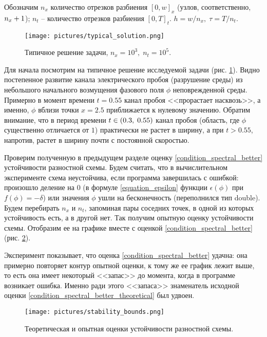 \documentclass[a4paper,12pt]{article}
\newcommand*{\hm}[1]{#1\nobreak\discretionary{}
{\hbox{$\mathsurround=0pt #1$}}{}}
\theoremstyle{plain}
\theoremstyle{definition}
\begin{document}
Обозначим $n_x$ количество отрезков разбиения $[0, w]_x$ (узлов, соответственно, $n_x \hm + 1$); $n_t$ -- количество отрезков разбиения $[0, T]_t$. $h = w/n_x, \; \tau = T/n_t$.

\begin{figure}[!tp]
    \centering
    \texttt{[image: pictures/typical\_solution.png]}
    \vspace{-0.8cm}
    \caption{Типичное решение задачи, $n_x = 10^3, \; n_t = 10^5$.}
    \label{picture_typical_solution}
\end{figure}

Для начала посмотрим на типичное решение исследуемой задачи (рис. \ref{picture_typical_solution}). Видно постепенное развитие канала электрического пробоя (разрушение среды) из небольшого начального возмущения фазового поля $\phi$ неповрежденной среды. Примерно в момент времени $t = 0.55$ канал пробоя <<прорастает насквозь>>, а именно, $\phi$ вблизи точки $x = 2.5$ приближается к нулевому значению. Обратим внимание, что в период времени $t \hm \in (0.3, \; 0.55)$ канал пробоя (область, где $\phi$ существенно отличается от $1$) практически не растет в ширину, а при $t > 0.55$, напротив, растет в ширину почти с постоянной скоростью.

Проверим полученную в предыдущем разделе оценку \eqref{condition_spectral_better} устойчивости разностной схемы. Будем считать, что в вычислительном эксперименте схема неустойчива, если программа завершилась с ошибкой: произошло деление на $0$ (в формуле \eqref{equation_epsilon} функции $\epsilon(\phi)$ при $f(\phi) = -\delta$) или значения $\phi$ ушли на бесконечность (переполнился тип double). Будем перебирать $n_x$ и $n_t$, запоминая пары соседних точек, в одной из которых устойчивость есть, а в другой нет. Так получим опытную оценку устойчивости схемы. Отобразим ее на графике вместе с оценкой \eqref{condition_spectral_better} (рис. \ref{picture_stability_bounds}).

Эксперимент показывает, что оценка \eqref{condition_spectral_better} удачна: она примерно повторяет контур опытной оценки, к тому же ее график лежит выше, то есть она имеет некоторый <<запас>> до момента, когда в программе возникает ошибка. Именно ради этого <<запаса>> знаменатель исходной оценки  \eqref{condition_spectral_better_theoretical} был удвоен.

\begin{figure}[!tp]
    \centering
    \texttt{[image: pictures/stability\_bounds.png]}
    \vspace{-0.7cm}
    \caption{Теоретическая и опытная оценки устойчивости разностной схемы.}
    \label{picture_stability_bounds}
\end{figure}
\end{document}
